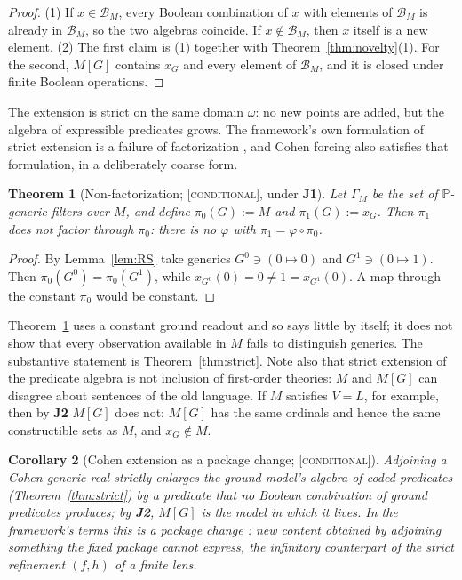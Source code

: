 \documentclass[11pt]{article}
\newcommand{\Cgen}{\mathbb{P}}                 \newcommand{\Fn}{\operatorname{Fn}}
\newcommand{\gradetag}[1]{\textnormal{\textsc{[#1]}}}
\newcommand{\condg}{\gradetag{conditional}}
\newtheorem{theorem}{Theorem}[section]
\newtheorem{corollary}[theorem]{Corollary}
\theoremstyle{definition}
\begin{document}
\begin{proof}
(1) If $x\in\mathcal B_M$, every Boolean combination of $x$ with elements of $\mathcal B_M$ is
already in $\mathcal B_M$, so the two algebras coincide. If $x\notin\mathcal B_M$, then $x$ itself
is a new element. (2) The first claim is (1) together with Theorem~\ref{thm:novelty}(1). For the
second, $M[G]$ contains $x_G$ and every element of $\mathcal B_M$, and it is closed under finite
Boolean operations.
\end{proof}

The extension is strict on the same domain $\omega$: no new points are added, but the algebra of
expressible predicates grows. The framework's own formulation of strict extension is a failure of
factorization \citep{SBTCantorShell}, and Cohen forcing also satisfies that formulation, in a
deliberately coarse form.

\begin{theorem}[Non-factorization; \condg, under \textbf{J1}]\label{thm:nonfactor}
Let $\Gamma_M$ be the set of $\Cgen$-generic filters over $M$, and define $\pi_0(G):=M$ and
$\pi_1(G):=x_G$. Then $\pi_1$ does not factor through $\pi_0$: there is no $\varphi$ with
$\pi_1=\varphi\circ\pi_0$.
\end{theorem}

\begin{proof}
By Lemma~\ref{lem:RS} take generics $G^0\ni(0\mapsto0)$ and $G^1\ni(0\mapsto1)$. Then
$\pi_0(G^0)=\pi_0(G^1)$, while $x_{G^0}(0)=0\ne1=x_{G^1}(0)$. A map through the constant $\pi_0$
would be constant.
\end{proof}

Theorem~\ref{thm:nonfactor} uses a constant ground readout and so says little by itself; it does not
show that every observation available in $M$ fails to distinguish generics. The substantive
statement is Theorem~\ref{thm:strict}. Note also that strict extension of the predicate algebra is
not inclusion of first-order theories: $M$ and $M[G]$ can disagree about sentences of the old
language. If $M$ satisfies $V=L$, for example, then by \textbf{J2} $M[G]$ does not: $M[G]$ has the
same ordinals and hence the same constructible sets as $M$, and $x_G\notin M$.

\begin{corollary}[Cohen extension as a package change; \condg]\label{cor:strictcohen}
Adjoining a Cohen-generic real strictly enlarges the ground model's algebra of coded predicates
(Theorem~\ref{thm:strict}) by a predicate that no Boolean combination of ground predicates
produces; by \textbf{J2}, $M[G]$ is the model in which it lives. In the framework's terms this is a
package change \citep{SBTIncompleteness,SBTCantorShell}: new content obtained by adjoining
something the fixed package cannot express, the infinitary counterpart of the strict refinement
$(f,h)$ of a finite lens.
\end{corollary}
\end{document}

